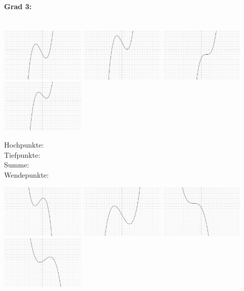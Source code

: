 \documentclass[12pt, parskip=half, a4paper, oneside]{scrartcl}
\begin{document}
\paragraph{Grad 3:}\textcolor{white}{.}\\
\includegraphics[width=4cm]{Bilder/G31}\hfill
\includegraphics[width=4cm]{Bilder/G32}\hfill
\includegraphics[width=4cm]{Bilder/G33}\hfill
\includegraphics[width=4cm]{Bilder/G34}

\begin{addmargin}[-2cm]{0pt}
Hochpunkte: \\
Tiefpunkte: \\
Summe: \\
Wendepunkte:
\end{addmargin}

\includegraphics[width=4cm]{Bilder/G35}\hfill
\includegraphics[width=4cm]{Bilder/G36}\hfill
\includegraphics[width=4cm]{Bilder/G37}\hfill
\includegraphics[width=4cm]{Bilder/G38}
\end{document}
